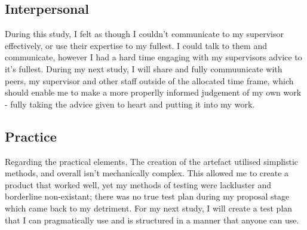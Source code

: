 \documentclass[conference]{IEEEtran}
\begin{document}
\subsection{Interpersonal}
During this study, I felt as though I couldn't communicate to my supervisor effectively, or use their expertise to my fullest. I could talk to them and communicate, however I had a hard time engaging with my supervisors advice to it's fullest. During my next study, I will share and fully commuunicate with peers, my supervisor and other staff outside of the allocated time frame, which should enable me to make  a more  properlly informed judgement of my own work - fully taking the advice given to heart and putting it into my work.

\subsection{Practice}
Regarding the practical elements,  The creation of the artefact utilised simplistic methods, and overall isn't mechanically complex. This allowed me to create a product that worked well, yet my methods of testing were lackluster and borderline non-existant; there was no true test plan during my proposal stage which came back to my detriment. For my next study, I will create a test plan that I can pragmatically use and is structured in a manner that anyone can use. 
\end{document}
